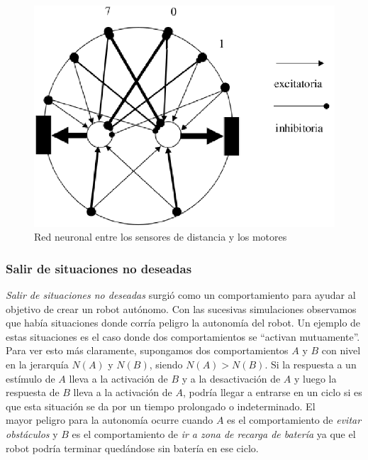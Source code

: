 \begin{figure}[htp]
\begin{center}
\includegraphics[scale=0.4]{comportamientos/figures/red.png}
\caption{Red neuronal entre los sensores de distancia y los motores}
\label{fig:redN}
\end{center}
\end{figure}

\subsubsection{Salir de situaciones no deseadas}
\label{out_of_unwanted_situations}
\emph{Salir de situaciones no deseadas} surgi\'o como un comportamiento
para ayudar al objetivo de crear un robot aut\'onomo. Con las sucesivas
simulaciones observamos que hab\'ia situaciones donde corr\'ia
peligro la autonom\'ia del robot. Un ejemplo de estas situaciones es el caso
donde dos comportamientos se ``activan mutuamente''.
\\\indent
Para ver esto m\'as claramente, supongamos dos comportamientos $A$ y $B$ con
nivel en la jerarqu\'ia $N(A)$ y $N(B)$, siendo $N(A) > N(B)$. Si la respuesta
a un est\'imulo de $A$ lleva a la activaci\'on de $B$ y a la desactivaci\'on de
$A$ y luego la respuesta de $B$ lleva a la activaci\'on de $A$, podr\'ia llegar
a entrarse en un ciclo si es que esta situaci\'on se da por un tiempo
prolongado o indeterminado. El\\
mayor peligro para la autonom\'ia ocurre
cuando $A$ es el comportamiento de \emph{evitar obst\'aculos} y $B$ es el
comportamiento de \emph{ir a zona de recarga de bater\'ia} ya que el robot
podr\'ia terminar qued\'andose sin bater\'ia en ese ciclo.

